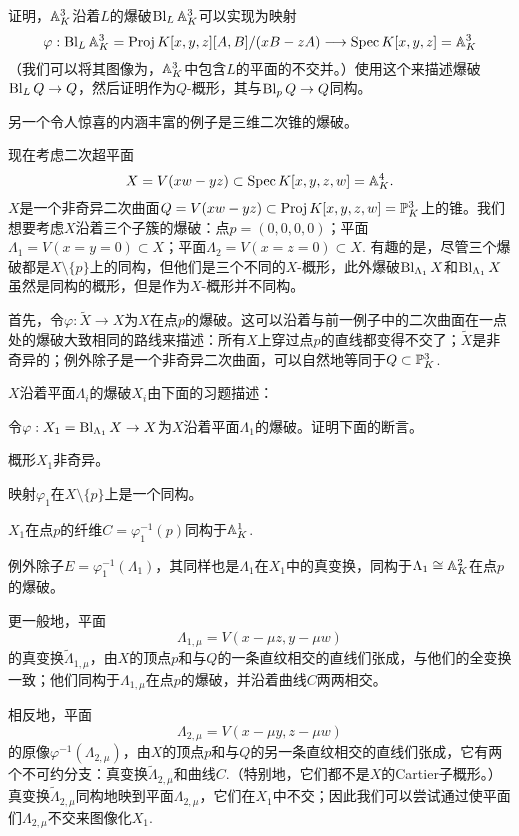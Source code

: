 \begin{exe}\label{exe:4.28}
	证明，$\mathbb{A}^3_K$沿着$L$的爆破$\operatorname{Bl}_L\mathbb{A}_K^3$可以实现为映射
	\[
		\varphi:\operatorname{Bl}_L \mathbb A_K^3=\operatorname{Proj} K[x,y,z][A,B]/(xB-zA)\longrightarrow \operatorname{Spec} K[x,y,z]=\mathbb A_K^3
	\]
	（我们可以将其图像为，$\mathbb{A}_K^3$中包含$L$的平面的不交并。）使用这个来描述爆破$\operatorname{Bl}_L Q\to Q$，然后证明作为$Q$-概形，其与$\operatorname{Bl}_p Q\to Q$同构。
\end{exe}

另一个令人惊喜的内涵丰富的例子是三维二次锥的爆破。

\begin{exa}\label{exa:4.29}
	现在考虑二次超平面
	\[
	X=V(xw-yz)\subset \operatorname{Spec} K[x,y,z,w]=\mathbb A_K^4.
	\]
	$X$是一个非奇异二次曲面$Q=V(xw-yz)\subset \operatorname{Proj} K[x,y,z,w]=\mathbb{P}_K^3$上的锥。我们想要考虑$X$沿着三个子簇的爆破：点$p=(0,0,0,0)$；平面$\Lambda_1=V(x=y=0)\subset X$；平面$\Lambda_2=V(x=z=0)\subset X$. 有趣的是，尽管三个爆破都是$X\setminus \{p\}$上的同构，但他们是三个不同的$X$-概形，此外爆破$\operatorname{Bl}_{\Lambda_1}X$和$\operatorname{Bl}_{\Lambda_1}X$虽然是同构的概形，但是作为$X$-概形并不同构。
\end{exa}

首先，令$\varphi:\tilde X\to X$为$X$在点$p$的爆破。这可以沿着与前一例子中的二次曲面在一点处的爆破大致相同的路线来描述：所有$X$上穿过点$p$的直线都变得不交了；$\tilde X$是非奇异的；例外除子是一个非奇异二次曲面，可以自然地等同于$Q\subset \mathbb{P}_K^3$.

$X$沿着平面$\Lambda_i$的爆破$X_i$由下面的习题描述：

\begin{exe}\label{exe:4.30}
	令$\varphi:X_1=\operatorname{Bl}_{\Lambda_1}X\to X$为$X$沿着平面$\Lambda_1$的爆破。证明下面的断言。
	\begin{compactenum}[(a)]
		\item 概形$X_1$非奇异。
		\item 映射$\varphi_1$在$X\setminus \{p\}$上是一个同构。
		\item $X_1$在点$p$的纤维$C=\varphi_1^{-1}(p)$同构于$\mathbb{A}_K^1$.
		\item 例外除子$E=\varphi_1^{-1}(\Lambda_1)$，其同样也是$\Lambda_1$在$X_1$中的真变换，同构于$\Lambda_1\cong \mathbb{A}_K^2$在点$p$的爆破。
		\item 更一般地，平面
			\[
				\Lambda_{1,\mu}=V(x-\mu z,y-\mu w)
			\]
			的真变换$\tilde \Lambda_{1,\mu}$，由$X$的顶点$p$和与$Q$的一条直纹相交的直线们张成，与他们的全变换一致；他们同构于$\Lambda_{1,\mu}$在点$p$的爆破，并沿着曲线$C$两两相交。\nottran
		\item 相反地，平面
			\[
				\Lambda_{2,\mu}=V(x-\mu y,z-\mu w)
			\]
			的原像$\varphi^{-1}(\Lambda_{2,\mu})$，由$X$的顶点$p$和与$Q$的另一条直纹相交的直线们张成，它有两个不可约分支：真变换$\tilde \Lambda_{2,\mu}$和曲线$C$.（特别地，它们都不是$X$的Cartier子概形。）真变换$\tilde \Lambda_{2,\mu}$同构地映到平面$\Lambda_{2,\mu}$，它们在$X_1$中不交；因此我们可以尝试通过使平面们$\Lambda_{2,\mu}$不交来图像化$X_1$. 

	\end{compactenum}
\end{exe}

